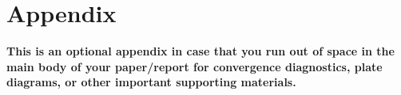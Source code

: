 \documentclass[12,runningheads,a4paper]{llncs}
\newcommand{\1}[1]{\mathbb{I}\!\left[#1\right]} %
\begin{document}
\clearpage
\newpage

 
 


\clearpage
\newpage

\section*{Appendix}

\textbf{This is an optional appendix in case that you run out of space in the main body of your paper/report for convergence diagnostics, plate diagrams, or other important supporting materials.}
\end{document}
